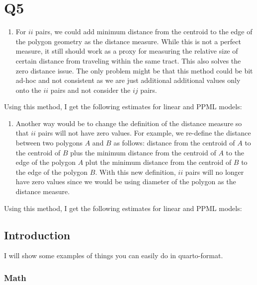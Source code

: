 \documentclass[
  11pt]{article}
\providecommand{\tightlist}{%
  \setlength{\itemsep}{0pt}\setlength{\parskip}{0pt}}
\begin{document}
\section*{Q5}\label{q5}

\begin{enumerate}
\def\labelenumi{\arabic{enumi}.}
\tightlist
\item
  For \(ii\) pairs, we could add minimum distance from the centroid to
  the edge of the polygon geometry as the distance measure. While this
  is not a perfect measure, it still should work as a proxy for
  measuring the relative size of certain distance from traveling within
  the same tract. This also solves the zero distance issue. The only
  problem might be that this method could be bit ad-hoc and not
  consistent as we are just additional additional values only onto the
  \(ii\) pairs and not consider the \(ij\) pairs.
\end{enumerate}

Using this method, I get the following estimates for linear and PPML
models:

\begin{enumerate}
\def\labelenumi{\arabic{enumi}.}
\setcounter{enumi}{1}
\tightlist
\item
  Another way would be to change the definition of the distance measure
  so that \(ii\) pairs will not have zero values. For example, we
  re-define the distance between two polygons \(A\) and \(B\) as
  follows: distance from the centroid of \(A\) to the centroid of \(B\)
  plus the minimum distance from the centroid of \(A\) to the edge of
  the polygon \(A\) plut the minimum distance from the centroid of \(B\)
  to the edge of the polygon \(B\). With this new definition, \(ii\)
  pairs will no longer have zero values since we would be using diameter
  of the polygon as the distance measure.
\end{enumerate}

Using this method, I get the following estimates for linear and PPML
models:

\clearpage

\subsection{Introduction}\label{sec-intro}

I will show some examples of things you can easily do in quarto-format.

\subsubsection{Math}\label{math}
\end{document}
